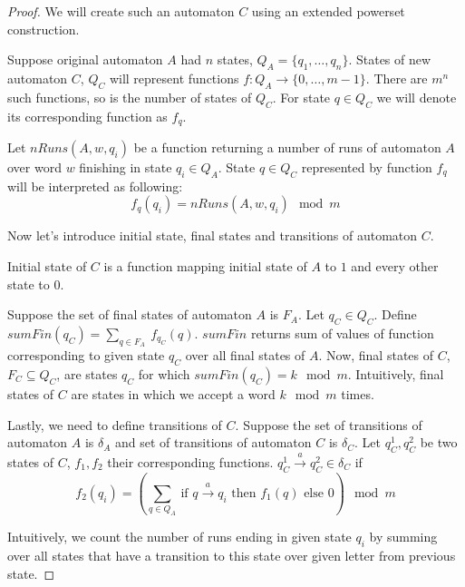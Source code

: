 \documentclass[12pt]{article}
\theoremstyle{definition}
\begin{document}
\begin{proof}
    We will create such an automaton $C$ using an extended powerset construction.

    Suppose original automaton $A$ had $n$ states, $Q_A = \{q_1, \ldots, q_n\}$. States of new automaton $C$, $Q_C$ will represent functions $f: Q_A \rightarrow \{0, \ldots, m-1 \}$. There are $m^n$ such functions, so is the number of states of $Q_C$. For state $q \in Q_C$ we will denote its corresponding function as $f_q$.
    
    Let $nRuns(A, w, q_i)$ be a function returning a number of runs of automaton $A$ over word $w$ finishing in state $q_i \in Q_A$. State $q \in Q_C$ represented by function $f_q$ will be interpreted as following:
    $$f_q(q_i) = nRuns(A, w, q_i) \mod m$$


    Now let's introduce initial state, final states and transitions of automaton $C$.

    Initial state of $C$ is a function mapping initial state of $A$ to $1$ and every other state to $0$.

    Suppose the set of final states of automaton $A$ is $F_A$. Let $q_C \in Q_C$. Define $sumFin(q_C) = \sum_{q \in F_A} \ f_{q_C}(q)$. $sumFin$ returns sum of values of function corresponding to given state $q_C$ over all final states of $A$. Now, final states of $C$, $F_C \subseteq Q_C$, are states $q_C$ for which $sumFin(q_C) = k \mod m$. Intuitively, final states of $C$ are states in which we accept a word $k \mod m$ times.

    Lastly, we need to define transitions of $C$. Suppose the set of transitions of automaton $A$ is $\delta_A$ and set of transitions of automaton $C$ is $\delta_C$. Let $q_C^1, q_C^2$ be two states of $C$, $f_1, f_2$ their corresponding functions. $q_C^1 \xrightarrow{a} q_C^2 \in \delta_C$ if 
    $$f_2(q_i) = (\sum_{q \in Q_A} \ \text{if } q \xrightarrow{a} q_i \text{ then } f_1(q) \text{ else } 0) \mod m$$

    Intuitively, we count the number of runs ending in given state $q_i$ by summing over all states that have a transition to this state over given letter from previous state.


\end{proof}
\end{document}
